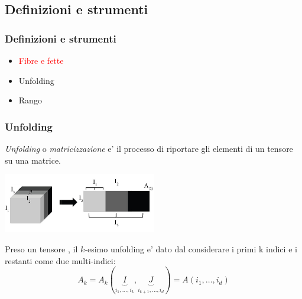 \documentclass{beamer}
\newcommand{\nota}[1]{\textcolor{red}{#1}}
\theoremstyle{definition}
\theoremstyle{plain}
\begin{document}
\subsection{Definizioni e strumenti}
\begin{frame}
\frametitle{Definizioni e strumenti}
\begin{itemize}
\item \nota{Fibre e fette}
\item Unfolding
\item Rango
\end{itemize}
\end{frame}

\begin{frame}
\frametitle{Unfolding}
\emph{Unfolding} o \emph{matricizzazione} e' il processo di riportare gli elementi di un tensore su una matrice.

\begin{center}
	\includegraphics[width=0.5\textwidth]{Img/unfolding.jpg}
\end{center}

Preso un tensore \A, il $k$-esimo unfolding e' dato dal considerare i primi k indici e i restanti come due multi-indici:
\begin{equation*}
	A_k = A_k(
	\underbrace{I}_{i_1,\dots,i_k}
	,
	\underbrace{J}_{i_{k+1},\dots,i_d}
	) = A(i_1,\dots,i_d)	
\end{equation*}
\end{frame}
\end{document}
